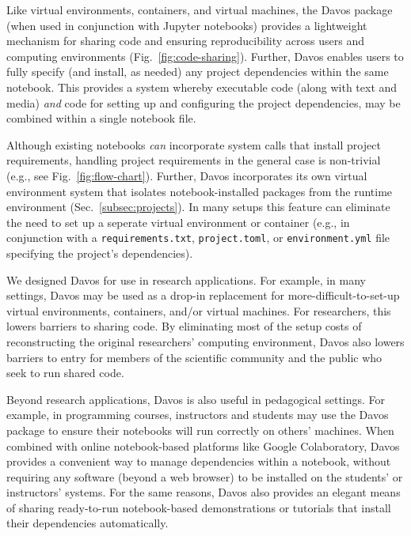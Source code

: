 \documentclass[preprint,12pt,a4paper]{elsarticle}
\begin{document}
Like virtual environments, containers, and virtual machines, the
Davos package (when used in conjunction with Jupyter
notebooks) provides a light\-weight mechanism for sharing code and
ensuring reproducibility across users and computing environments
(Fig.~\ref{fig:code-sharing}). Further, Davos enables users
to fully specify (and install, as needed) any project dependencies
within the same notebook. This provides a system whereby executable
code (along with text and media) \textit{and} code for setting up and
configuring the project dependencies, may be combined within a single
notebook file.

Although existing notebooks \textit{can} incorporate system calls that install
project requirements, handling project requirements in the general case is
non-trivial (e.g., see Fig.~\ref{fig:flow-chart}). Further, Davos
incorporates its own virtual environment system that isolates
notebook-installed packages from the runtime environment
(Sec.~\ref{subsec:projects}). In many setups this feature can eliminate the
need to set up a seperate virtual environment or container (e.g., in
conjunction with a \texttt{requirements.txt}, \texttt{project.toml}, or
\texttt{environment.yml} file specifying the project's dependencies).

We designed Davos for use in research applications. For
example, in many settings, Davos may be used as a drop-in
replacement for more-difficult-to-set-up virtual environments,
containers, and/or virtual machines. For researchers, this lowers
barriers to sharing code. By eliminating most of the setup costs of
reconstructing the original researchers' computing environment,
Davos also lowers barriers to entry for members of the
scientific community and the public who seek to run shared code.

Beyond research applications, Davos is also useful in
pedagogical settings. For example, in programming courses, instructors
and students may use the Davos package to ensure their
notebooks will run correctly on others' machines. When combined with
online notebook-based platforms like Google Colaboratory,
Davos provides a convenient way to manage dependencies within
a notebook, without requiring any software (beyond a web browser) to
be installed on the students' or instructors' systems. For the same
reasons, Davos also provides an elegant means of sharing
ready-to-run notebook-based demonstrations or tutorials that install
their dependencies automatically.
\end{document}
